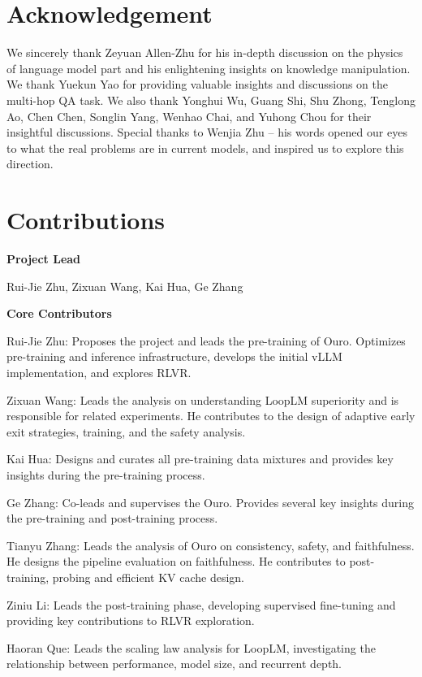 \documentclass[]{bytedance_seed}
\newcommand{\1}{\mathbf{1}}
\newcommand{\ut}{LoopLM}
\begin{document}
{\section*{Acknowledgement}
We sincerely thank Zeyuan Allen-Zhu for his in-depth discussion on the physics of language model part and his enlightening insights on knowledge manipulation. We thank Yuekun Yao for providing valuable insights and discussions on the multi-hop QA task. We also thank Yonghui Wu, Guang Shi, Shu Zhong, Tenglong Ao, Chen Chen, Songlin Yang, Wenhao Chai, and Yuhong Chou for their insightful discussions. Special thanks to Wenjia Zhu -- his words opened our eyes to what the real problems are in current models, and inspired us to explore this direction.
\newpage

\section*{Contributions}

\textbf{Project Lead}

Rui-Jie Zhu, Zixuan Wang, Kai Hua, Ge Zhang

\textbf{Core Contributors}

Rui-Jie Zhu: Proposes the project and leads the pre-training of Ouro. Optimizes pre-training and inference infrastructure, develops the initial vLLM implementation, and explores RLVR.

Zixuan Wang: Leads the analysis on understanding \ut{} superiority and is responsible for related experiments. He contributes to the design of adaptive early exit strategies, training, and the safety analysis. 

Kai Hua: Designs and curates all pre-training data mixtures and provides key insights during the pre-training process.

Ge Zhang: Co-leads and supervises the Ouro. Provides several key insights during the pre-training and post-training process.

Tianyu Zhang: Leads the analysis of Ouro on consistency, safety, and faithfulness. He designs the pipeline evaluation on faithfulness. He contributes to post-training, probing and efficient KV cache design.

Ziniu Li: Leads the post-training phase, developing supervised fine-tuning and providing key contributions to RLVR exploration.

Haoran Que: Leads the scaling law analysis for \ut{}, investigating the relationship between performance, model size, and recurrent depth.

}
\end{document}
